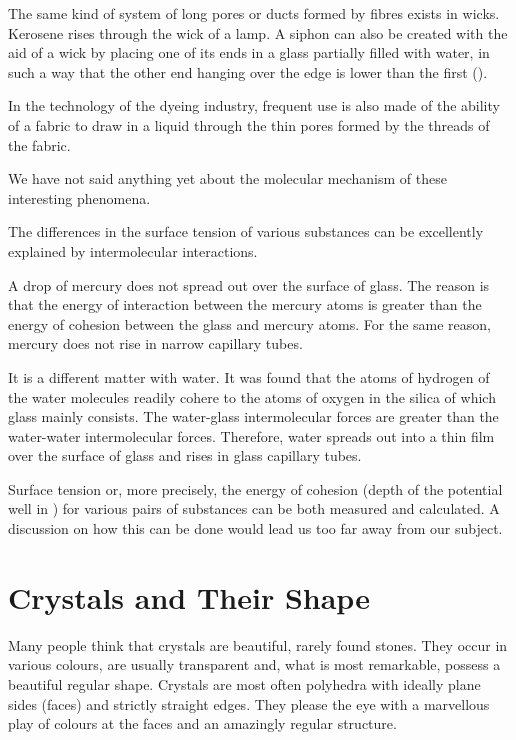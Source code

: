 The same kind of system of long pores or ducts formed by fibres exists in wicks. Kerosene rises through the wick of a lamp. A siphon can also be created with the aid of a wick by placing one of its ends in a glass partially filled with water, in such a way that the other end hanging over the edge is lower than the first ().

In the technology of the dyeing industry, frequent use is also made of the ability of a fabric to draw in a liquid through the thin pores formed by the threads of the fabric.

We have not said anything yet about the molecular mechanism of these interesting phenomena.

The differences in the surface tension of various substances can be excellently explained by intermolecular interactions.

A drop of mercury does not spread out over the surface of glass. The reason is that the energy of interaction between the mercury atoms is greater than the energy of cohesion between the glass and mercury atoms. For the same reason, mercury does not rise in narrow capillary tubes.

It is a different matter with water. It was found that the atoms of hydrogen of the water molecules readily cohere to the atoms of oxygen in the silica of which glass mainly consists. The water-glass intermolecular forces are greater than the water-water intermolecular forces. Therefore, water spreads out into a thin film over the surface of glass and rises in glass capillary tubes.

Surface tension or, more precisely, the energy of cohe­sion (depth of the potential well in ) for various pairs of substances can be both measured and calculated. A discussion on how this can be done would lead us too far away from our subject.


\section{Crystals and Their Shape}

Many people think that crystals are beautiful, rarely found stones. They occur in various colours, are usually transparent and, what is most remarkable, possess a beautiful regular shape. Crystals are most often polyhedra with ideally plane sides (faces) and strictly straight edges. They please the eye with a marvellous play of colours at the faces and an amazingly regular structure.

